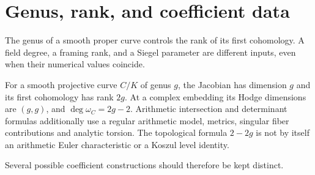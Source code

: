 \section{Genus, rank, and coefficient data}

The genus of a smooth proper curve controls the rank of its first
cohomology. A field degree, a framing rank, and a Siegel parameter are
different inputs, even when their numerical values coincide.

For a smooth projective curve $C/K$ of genus $g$, the Jacobian has dimension
$g$ and its first cohomology has rank $2g$. At a complex embedding its Hodge
dimensions are $(g,g)$, and $\deg\omega_C=2g-2$. Arithmetic intersection and
determinant formulas additionally use a regular arithmetic model, metrics,
singular fiber contributions and analytic torsion. The topological formula
$2-2g$ is not by itself an arithmetic Euler characteristic or a Koszul level
identity.

Several possible coefficient constructions should therefore be kept
distinct.

